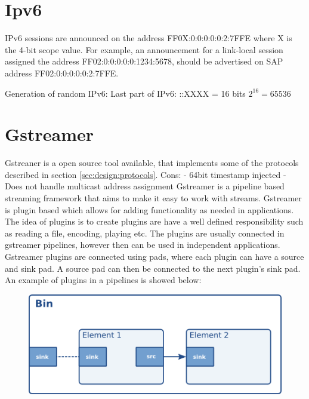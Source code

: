 \section{Ipv6}
   IPv6 sessions are announced on the address FF0X:0:0:0:0:0:2:7FFE
      where X is the 4-bit scope value.  For example, an announcement
      for a link-local session assigned the address
      FF02:0:0:0:0:0:1234:5678, should be advertised on SAP address
      FF02:0:0:0:0:0:2:7FFE.
      

Generation of random IPv6:
Last part of IPv6:
::XXXX = 16 bits
$2^16 = 65536$


\section{Gstreamer}
Gstreaner is a open source tool available, that implements some of the protocols described in section \ref{sec:design:protocols}.
Cons:
 - 64bit timestamp injected
 - Does not handle multicast address assignment
Gstreamer is a pipeline based streaming framework that aims to make it easy to work with streams. Gstreamer is plugin based which allows for adding functionality as needed in applications. The idea of plugins is to create plugins are have a well defined responsibility such as reading a file, encoding, playing etc. The plugins are usually connected in gstreamer pipelines, however then can be used in independent applications. Gstreamer plugins are connected using pads, where each plugin can have a source and sink pad. A source pad can then be connected to the next plugin's sink pad. An example of plugins in a pipelines is showed below:
\begin{figure}
	\includegraphics[width=1\textwidth]{figures/bin-element-ghost.png}
\end{figure}


